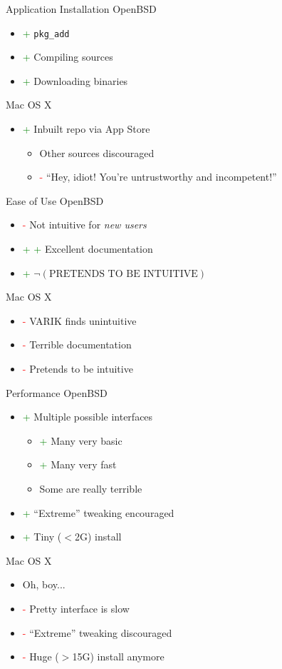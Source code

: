 \documentclass{beamer}
\newcommand{\good}{\textcolor{green}{+ }}
\newcommand{\bad}{\textcolor{red}{- }}
\begin{document}
			\begin{frame}{Application Installation}
				OpenBSD
				\begin{itemize}
					\item \good \texttt{pkg\_add}
					\item \good Compiling sources
					\item \good Downloading binaries
				\end{itemize}
				Mac OS X
				\begin{itemize}
					\item \good Inbuilt repo via App Store
					\begin{itemize}
						\item Other sources discouraged
						\item \bad ``Hey, idiot!  You're untrustworthy and incompetent!''
					\end{itemize}
				\end{itemize}
			\end{frame}
			\begin{frame}{Ease of Use}
				OpenBSD
				\begin{itemize}
					\item \bad Not intuitive for \textit{new users}
					\item \good \good Excellent documentation
					\item \good $\neg\left(\textrm{PRETENDS TO BE INTUITIVE}\right)$
				\end{itemize}
				Mac OS X
				\begin{itemize}
					\item \bad VARIK finds unintuitive
					\item \bad Terrible documentation
					\item \bad Pretends to be intuitive
				\end{itemize}
			\end{frame}
			\begin{frame}{Performance}
				OpenBSD
				\begin{itemize}
					\item \good Multiple possible interfaces
					\begin{itemize}
						\item \good Many very basic
						\item \good Many very fast
						\item Some are really terrible
					\end{itemize}
					\item \good ``Extreme'' tweaking encouraged
					\item \good Tiny ($<$2G) install
				\end{itemize}
				Mac OS X
				\begin{itemize}
					\item Oh, boy...
					\item \bad Pretty interface is slow
					\item \bad ``Extreme'' tweaking discouraged
					\item \bad Huge ($>$15G) install anymore
				\end{itemize}
			\end{frame}
\end{document}
